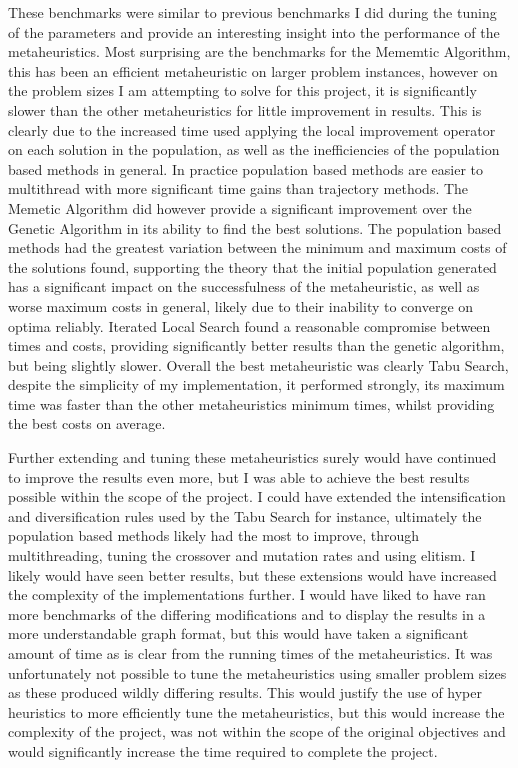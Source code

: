 \documentclass[]{final_report}
\begin{document}
These benchmarks were similar to previous benchmarks I did during the tuning of the parameters and provide an interesting insight into the performance of the metaheuristics. Most surprising are the benchmarks for the Mememtic Algorithm, this has been an efficient metaheuristic on larger problem instances, however on the problem sizes I am attempting to solve for this project, it is significantly slower than the other metaheuristics for little improvement in results. This is clearly due to the increased time used applying the local improvement operator on each solution in the population, as well as the inefficiencies of the population based methods in general. In practice population based methods are easier to multithread with more significant time gains than trajectory methods. The Memetic Algorithm did however provide a significant improvement over the Genetic Algorithm in its ability to find the best solutions. The population based methods had the greatest variation between the minimum and maximum costs of the solutions found, supporting the theory that the initial population generated has a significant impact on the successfulness of the metaheuristic, as well as worse maximum costs in general, likely due to their inability to converge on optima reliably. Iterated Local Search found a reasonable compromise between times and costs, providing significantly better results than the genetic algorithm, but being slightly slower. Overall the best metaheuristic was clearly Tabu Search, despite the simplicity of my implementation, it performed strongly, its maximum time was faster than the other metaheuristics minimum times, whilst providing the best costs on average.

Further extending and tuning these metaheuristics surely would have continued to improve the results even more, but I was able to achieve the best results possible within the scope of the project. I could have extended the intensification and diversification rules used by the Tabu Search for instance, ultimately the population based methods likely had the most to improve, through multithreading, tuning the crossover and mutation rates and using elitism. I likely would have seen better results, but these extensions would have increased the complexity of the implementations further. I would have liked to have ran more benchmarks of the differing modifications and to display the results in a more understandable graph format, but this would have taken a significant amount of time as is clear from the running times of the metaheuristics. It was unfortunately not possible to tune the metaheuristics using smaller problem sizes as these produced wildly differing results. This would justify the use of hyper heuristics to more efficiently tune the metaheuristics, but this would increase the complexity of the project, was not within the scope of the original objectives and would significantly increase the time required to complete the project.
\end{document}
